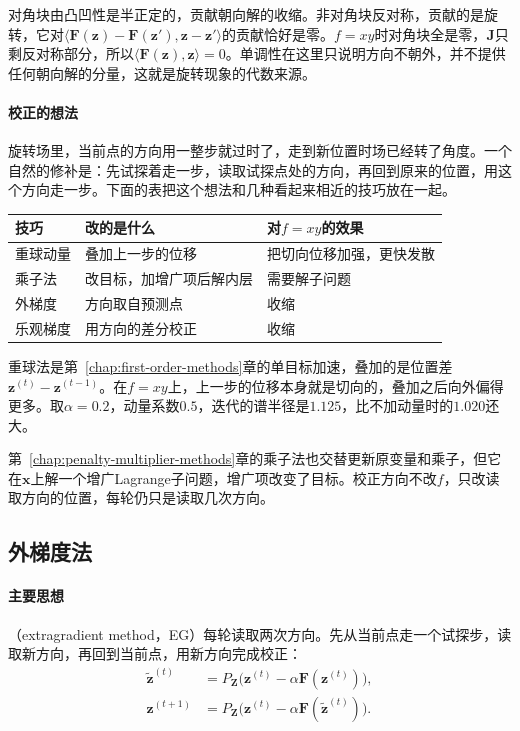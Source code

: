 对角块由凸凹性是半正定的，贡献朝向解的收缩。非对角块反对称，贡献的是旋转，它对$\langle\bm{F}(\bm{z})-\bm{F}(\bm{z}'),\bm{z}-\bm{z}'\rangle$的贡献恰好是零。$f=xy$时对角块全是零，$\bm{J}$只剩反对称部分，所以$\langle\bm{F}(\bm{z}),\bm{z}\rangle=0$。单调性在这里只说明方向不朝外，并不提供任何朝向解的分量，这就是旋转现象的代数来源。

\paragraph{校正的想法}
旋转场里，当前点的方向用一整步就过时了，走到新位置时场已经转了角度。一个自然的修补是：先试探着走一步，读取试探点处的方向，再回到原来的位置，用这个方向走一步。下面的表把这个想法和几种看起来相近的技巧放在一起。

\begin{BookInlineTable}
 \centering
 \begin{tabular}{@{}lll@{}}
  \toprule
  技巧 & 改的是什么 & 对$f=xy$的效果\\
  \midrule
  重球动量 & 叠加上一步的位移 & 把切向位移加强，更快发散\\
  乘子法 & 改目标，加增广项后解内层 & 需要解子问题\\
  外梯度 & 方向取自预测点 & 收缩\\
  乐观梯度 & 用方向的差分校正 & 收缩\\
  \bottomrule
 \end{tabular}
 \caption{几种修改迭代或目标的办法。前两种不是校正方向。}
 \label{tab:minimax-correction-compare}
\end{BookInlineTable}

重球法是第~\ref{chap:first-order-methods}章的单目标加速，叠加的是位置差$\bm{z}^{(t)}-\bm{z}^{(t-1)}$。在$f=xy$上，上一步的位移本身就是切向的，叠加之后向外偏得更多。取$\alpha=0.2$，动量系数$0.5$，迭代的谱半径是$1.125$，比不加动量时的$1.020$还大。

第~\ref{chap:penalty-multiplier-methods}章的乘子法也交替更新原变量和乘子，但它在$\bm{x}$上解一个增广Lagrange子问题，增广项改变了目标。校正方向不改$f$，只改读取方向的位置，每轮仍只是读取几次方向。

\subsection{外梯度法}
\label{sec:minimax-extragradient}

\paragraph{主要思想}
（extragradient method，EG）每轮读取两次方向。先从当前点走一个试探步，读取新方向，再回到当前点，用新方向完成校正：
\begin{equation}
 \begin{aligned}
 \tilde{\bm{z}}^{(t)}&=P_{\bm{Z}}\bigl(\bm{z}^{(t)}-\alpha\bm{F}(\bm{z}^{(t)})\bigr),\\
 \bm{z}^{(t+1)}&=P_{\bm{Z}}\bigl(\bm{z}^{(t)}-\alpha\bm{F}(\tilde{\bm{z}}^{(t)})\bigr).
 \end{aligned}
 \label{eq:minimax-eg}
\end{equation}

